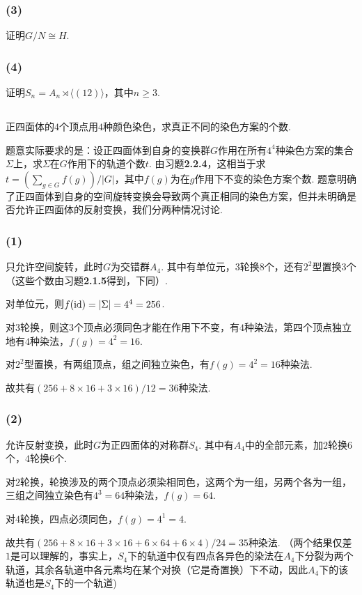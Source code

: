 
\subsubsection{(3)}
证明$G/N\cong H$.

\Proofbyintimidation

\subsubsection{(4)}
证明$S_n=A_n\rtimes\langle(12)\rangle$，其中$n\geq 3$.


\subsection{}
正四面体的$4$个顶点用$4$种颜色染色，求真正不同的染色方案的个数.

\jie
题意实际要求的是：设正四面体到自身的变换群$G$作用在所有$4^4$种染色方案的集合$\Sigma$上，求$\Sigma$在$G$作用下的轨道个数$t$. 由{\heiti 习题}\textbf{2.2.4}，这相当于求$t=(\sum_{g\in G}f(g))/|G|$，其中$f(g)$为在$g$作用下不变的染色方案个数. 题意明确了正四面体到自身的空间旋转变换会导致两个真正相同的染色方案，但并未明确是否允许正四面体的反射变换，我们分两种情况讨论.

\subsubsection{(1)}
只允许空间旋转，此时$G$为交错群$A_4$. 其中有单位元，$3$轮换$8$个，还有$2^2$型置换$3$个（这些个数由{\heiti 习题}\textbf{2.1.5}得到，下同）.

对单位元，则$f(\operatorname{id})=|\Sigma|=4^4=256$.

对$3$轮换，则这$3$个顶点必须同色才能在作用下不变，有$4$种染法，第四个顶点独立地有$4$种染法，$f(g)=4^2=16$.

对$2^2$型置换，有两组顶点，组之间独立染色，有$f(g)=4^2=16$种染法.

故共有$(256+8\times16+3\times16)/12=36$种染法.

\subsubsection{(2)}
允许反射变换，此时$G$为正四面体的对称群$S_4$. 其中有$A_4$中的全部元素，加$2$轮换$6$个，$4$轮换$6$个.

对$2$轮换，轮换涉及的两个顶点必须染相同色，这两个为一组，另两个各为一组，三组之间独立染色有$4^3=64$种染法，$f(g)=64$.

对$4$轮换，四点必须同色，$f(g)=4^1=4$.

故共有$(256+8\times16+3\times16+6\times64+6\times4)/24=35$种染法. （两个结果仅差$1$是可以理解的，事实上，$S_4$下的轨道中仅有四点各异色的染法在$A_4$下分裂为两个轨道，其余各轨道中各元素均在某个对换（它是奇置换）下不动，因此$A_4$下的该轨道也是$S_4$下的一个轨道)